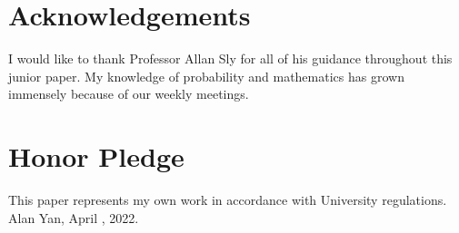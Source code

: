 \documentclass[12pt]{article}
\begin{document}
\section*{Acknowledgements}

I would like to thank Professor Allan Sly for all of his guidance throughout this junior paper. My knowledge of probability and mathematics has grown immensely because of our weekly meetings. 

\section*{Honor Pledge}
This paper represents my own work in accordance with University regulations. Alan Yan, April , 2022. 

{}


\end{document}
